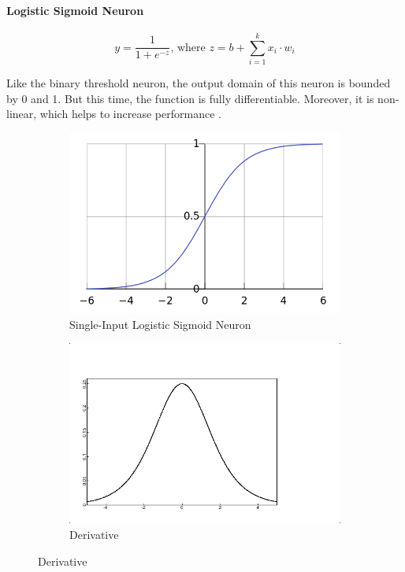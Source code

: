\documentclass[a4paper,11pt]{article}
\begin{document}
\paragraph{Logistic Sigmoid Neuron} 
\begin{equation}
\label{sigmoid neuron}
y = \frac{1}{1 + e^{-z}} \text{, where } z = b + \sum\limits_{i=1}^k x_{i}\cdot w_{i}
\end{equation}

Like the binary threshold neuron, the output domain of this neuron is bounded by 0 and 1. But this time, the function is fully differentiable. Moreover, it is non-linear, which helps to increase performance \cite{DL-book}.

\begin{figure}[h!]
	\centering
	\begin{subfigure}{.5\textwidth}
  		\centering
		\includegraphics[scale=0.4]{images/sigmoid.png}
		\caption{Single-Input Logistic Sigmoid Neuron}
	\end{subfigure}%
	\begin{subfigure}{.5\textwidth}
  		\centering
		\includegraphics[scale=0.4]{images/logistic-derivative.png}
		\caption{Derivative}
	\end{subfigure}
\end{figure}
\end{document}
